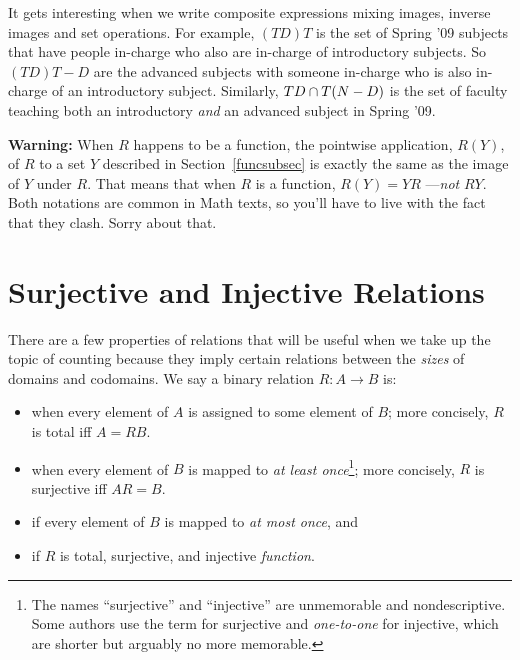 It gets interesting when we write composite expressions mixing images,
inverse images and set operations.  For example, $(TD)T$ is the set of
Spring '09 subjects that have people in-charge who also are in-charge of
introductory subjects.  So $(TD)T - D$ are the advanced subjects with
someone in-charge who is also in-charge of an introductory subject.
Similarly, $TD \cap T(N-D)$ is the set of faculty teaching both an
introductory \emph{and} an advanced subject in Spring '09.

\textbf{Warning:} When $R$ happens to be a function, the pointwise
application, $R(Y)$, of $R$ to a set $Y$ described in
Section~\ref{funcsubsec} is exactly the same as the image of $Y$ under
$R$.  That means that when $R$ is a function, $R(Y) = YR$ ---\emph{not}
$RY$.  Both notations are common in Math texts, so you'll have to live
with the fact that they clash.  Sorry about that.

\section{Surjective and Injective Relations}\label{surj_sec}

There are a few properties of relations that will be useful when we take
up the topic of counting because they imply certain relations between the
\emph{sizes} of domains and codomains.  We say a binary relation $R : A
\to B$ is:

\begin{itemize}

\item {} when every element of $A$ is assigned to some element of
  $B$; more concisely, $R$ is total iff $A=RB$.

\item {} when every element of $B$ is mapped to \textit{at
least once}\footnote{
The names ``surjective'' and ``injective'' are unmemorable and
nondescriptive.  Some authors use the term  for surjective and
\emph{one-to-one} for injective, which are shorter but arguably no more
memorable.}; more concisely, $R$ is surjective iff $AR=B$.

\item {} if every element of $B$ is mapped to \textit{at
most once}, and

\item {} if $R$ is total, surjective, and injective
  \emph{function}.

\end{itemize}

